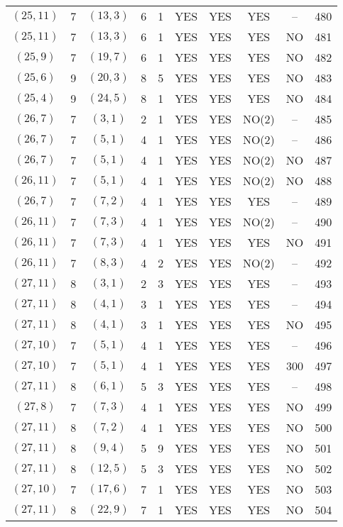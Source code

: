 \begin{longtable}{|c|c|c|c|c|c|c|c|c|c|}
$(25, 11)$ & 7 & $(13, 3)$ & 6 & 1 & YES & YES & YES & -- & 480\\
$(25, 11)$ & 7 & $(13, 3)$ & 6 & 1 & YES & YES & YES & NO & 481\\
$(25, 9)$ & 7 & $(19, 7)$ & 6 & 1 & YES & YES & YES & NO & 482\\
$(25, 6)$ & 9 & $(20, 3)$ & 8 & 5 & YES & YES & YES & NO & 483\\
$(25, 4)$ & 9 & $(24, 5)$ & 8 & 1 & YES & YES & YES & NO & 484\\
$(26, 7)$ & 7 & $(3, 1)$ & 2 & 1 & YES & YES & NO(2) & -- & 485\\
$(26, 7)$ & 7 & $(5, 1)$ & 4 & 1 & YES & YES & NO(2) & -- & 486\\
$(26, 7)$ & 7 & $(5, 1)$ & 4 & 1 & YES & YES & NO(2) & NO & 487\\
$(26, 11)$ & 7 & $(5, 1)$ & 4 & 1 & YES & YES & NO(2) & NO & 488\\
$(26, 7)$ & 7 & $(7, 2)$ & 4 & 1 & YES & YES & YES & -- & 489\\
$(26, 11)$ & 7 & $(7, 3)$ & 4 & 1 & YES & YES & NO(2) & -- & 490\\
$(26, 11)$ & 7 & $(7, 3)$ & 4 & 1 & YES & YES & YES & NO & 491\\
$(26, 11)$ & 7 & $(8, 3)$ & 4 & 2 & YES & YES & NO(2) & -- & 492\\
$(27, 11)$ & 8 & $(3, 1)$ & 2 & 3 & YES & YES & YES & -- & 493\\
$(27, 11)$ & 8 & $(4, 1)$ & 3 & 1 & YES & YES & YES & -- & 494\\
$(27, 11)$ & 8 & $(4, 1)$ & 3 & 1 & YES & YES & YES & NO & 495\\
$(27, 10)$ & 7 & $(5, 1)$ & 4 & 1 & YES & YES & YES & -- & 496\\
$(27, 10)$ & 7 & $(5, 1)$ & 4 & 1 & YES & YES & YES & 300 & 497\\
$(27, 11)$ & 8 & $(6, 1)$ & 5 & 3 & YES & YES & YES & -- & 498\\
$(27, 8)$ & 7 & $(7, 3)$ & 4 & 1 & YES & YES & YES & NO & 499\\
$(27, 11)$ & 8 & $(7, 2)$ & 4 & 1 & YES & YES & YES & NO & 500\\
$(27, 11)$ & 8 & $(9, 4)$ & 5 & 9 & YES & YES & YES & NO & 501\\
$(27, 11)$ & 8 & $(12, 5)$ & 5 & 3 & YES & YES & YES & NO & 502\\
$(27, 10)$ & 7 & $(17, 6)$ & 7 & 1 & YES & YES & YES & NO & 503\\
$(27, 11)$ & 8 & $(22, 9)$ & 7 & 1 & YES & YES & YES & NO & 504\\

\end{longtable}

